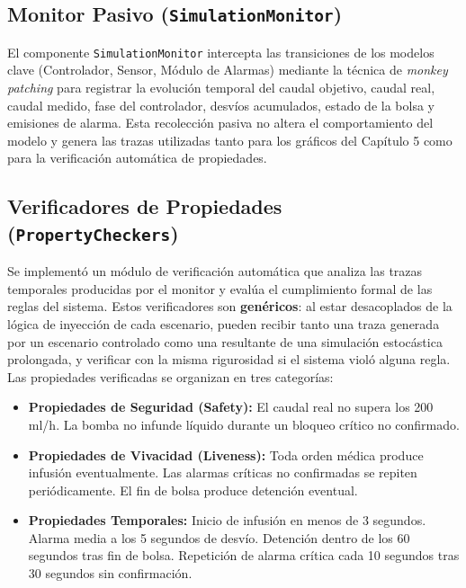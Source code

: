 \subsection{Monitor Pasivo (\texttt{SimulationMonitor})}
El componente \texttt{SimulationMonitor} intercepta las transiciones de los modelos clave (Controlador, Sensor, Módulo de Alarmas) mediante la técnica de \textit{monkey patching} para registrar la evolución temporal del caudal objetivo, caudal real, caudal medido, fase del controlador, desvíos acumulados, estado de la bolsa y emisiones de alarma. Esta recolección pasiva no altera el comportamiento del modelo y genera las trazas utilizadas tanto para los gráficos del Capítulo 5 como para la verificación automática de propiedades.

\subsection{Verificadores de Propiedades (\texttt{PropertyCheckers})}
Se implementó un módulo de verificación automática que analiza las trazas temporales producidas por el monitor y evalúa el cumplimiento formal de las reglas del sistema. Estos verificadores son \textbf{genéricos}: al estar desacoplados de la lógica de inyección de cada escenario, pueden recibir tanto una traza generada por un escenario controlado como una resultante de una simulación estocástica prolongada, y verificar con la misma rigurosidad si el sistema violó alguna regla. Las propiedades verificadas se organizan en tres categorías:
\begin{itemize}
    \item \textbf{Propiedades de Seguridad (Safety):} El caudal real no supera los 200 ml/h. La bomba no infunde líquido durante un bloqueo crítico no confirmado.
    \item \textbf{Propiedades de Vivacidad (Liveness):} Toda orden médica produce infusión eventualmente. Las alarmas críticas no confirmadas se repiten periódicamente. El fin de bolsa produce detención eventual.
    \item \textbf{Propiedades Temporales:} Inicio de infusión en menos de 3 segundos. Alarma media a los 5 segundos de desvío. Detención dentro de los 60 segundos tras fin de bolsa. Repetición de alarma crítica cada 10 segundos tras 30 segundos sin confirmación.
\end{itemize}
